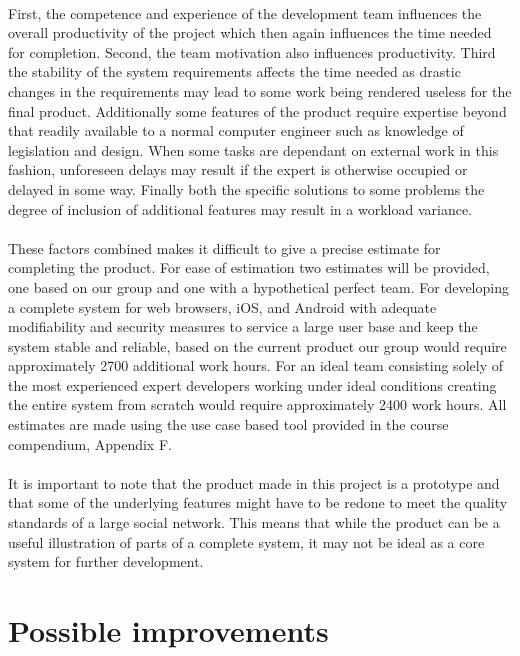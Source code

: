 \paragraph{} First, the competence and experience of the development team influences the overall productivity of the project which then again influences the time needed for completion. Second, the team motivation also influences productivity. Third the stability of the system requirements affects the time needed as drastic changes in the requirements may lead to some work being rendered useless for the final product. Additionally some features of the product require expertise beyond that readily available to a normal computer engineer such as knowledge of legislation and design. When some tasks are dependant on external work in this fashion, unforeseen delays may result if the expert is otherwise occupied or delayed in some way. Finally both the specific solutions to some problems the degree of inclusion of additional features may result in a workload variance. 
\paragraph{} These factors combined makes it difficult to give a precise estimate for completing the product. For ease of estimation two estimates will be provided, one based on our group and one with a hypothetical perfect team. For developing a complete system for web browsers, iOS, and Android with adequate modifiability and security measures to service a large user base and keep the system stable and reliable, based on the current product our group would require approximately 2700 additional work hours. For an ideal team consisting solely of the most experienced expert developers working under ideal conditions creating the entire system from scratch would require approximately 2400 work hours. All estimates are made using the use case based tool provided in the course compendium, Appendix F. \cite{CDPCompendium}
\paragraph{} It is important to note that the product made in this project is a prototype and that some of the underlying features might have to be redone to meet the quality standards of a large social network. This means that while the product can be a useful illustration of parts of a complete system, it may not be ideal as a core system for further development.

\section{Possible improvements}
\label{sec:FurtherImprovements}

